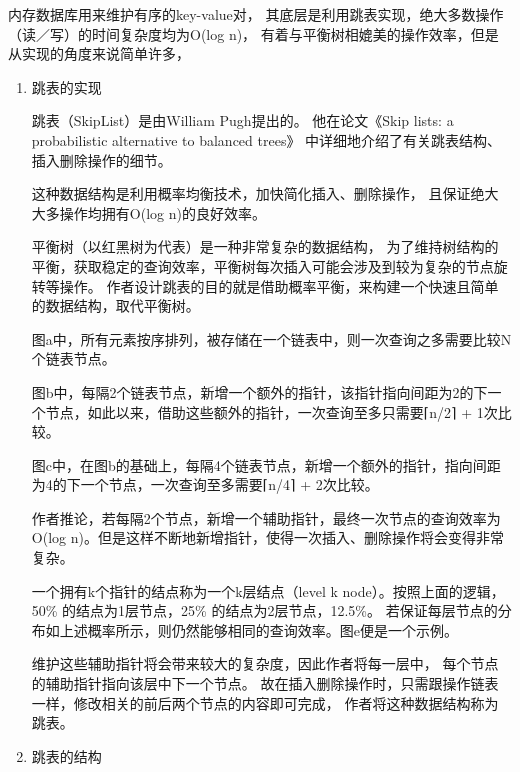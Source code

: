 		内存数据库用来维护有序的key-value对，
		其底层是利用跳表实现，绝大多数操作（读／写）的时间复杂度均为O(log n)，
		有着与平衡树相媲美的操作效率，但是从实现的角度来说简单许多，

		\begin{enumerate}
		\item 跳表的实现
		
		跳表（SkipList）是由William Pugh提出的。
		他在论文《Skip lists: a probabilistic alternative to balanced trees》
		中详细地介绍了有关跳表结构、插入删除操作的细节。

		这种数据结构是利用概率均衡技术，加快简化插入、删除操作，
		且保证绝大大多操作均拥有O(log n)的良好效率。
		


		平衡树（以红黑树为代表）是一种非常复杂的数据结构，
		为了维持树结构的平衡，获取稳定的查询效率，平衡树每次插入可能会涉及到较为复杂的节点旋转等操作。
		作者设计跳表的目的就是借助概率平衡，来构建一个快速且简单的数据结构，取代平衡树。

		


		图a中，所有元素按序排列，被存储在一个链表中，则一次查询之多需要比较N个链表节点。

		图b中，每隔2个链表节点，新增一个额外的指针，该指针指向间距为2的下一个节点，如此以来，借助这些额外的指针，一次查询至多只需要⌈n/2⌉ + 1次比较。

		图c中，在图b的基础上，每隔4个链表节点，新增一个额外的指针，指向间距为4的下一个节点，一次查询至多需要⌈n/4⌉ + 2次比较。

		作者推论，若每隔2个节点，新增一个辅助指针，最终一次节点的查询效率为O(log n)。但是这样不断地新增指针，使得一次插入、删除操作将会变得非常复杂。

		一个拥有k个指针的结点称为一个k层结点（level k node）。按照上面的逻辑，50\% 的结点为1层节点，25\% 的结点为2层节点，12.5\%。
		若保证每层节点的分布如上述概率所示，则仍然能够相同的查询效率。图e便是一个示例。

		维护这些辅助指针将会带来较大的复杂度，因此作者将每一层中，
		每个节点的辅助指针指向该层中下一个节点。
		故在插入删除操作时，只需跟操作链表一样，修改相关的前后两个节点的内容即可完成，
		作者将这种数据结构称为跳表。


		\item 跳表的结构
		


\end{enumerate}
